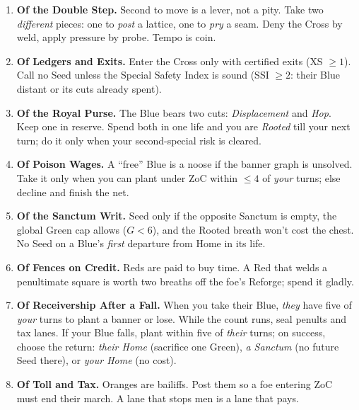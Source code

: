 \documentclass[11pt]{article}
\begin{document}
\begin{enumerate}[leftmargin=*,label=\Roman*.]

\item \textbf{Of the Double Step.} Second to move is a lever, not a pity. Take two \emph{different} pieces: one to \emph{post} a lattice, one to \emph{pry} a seam. Deny the Cross by weld, apply pressure by probe. Tempo is coin.

\item \textbf{Of Ledgers and Exits.} Enter the Cross only with certified exits (\textsc{XS} $\ge 1$). Call no Seed unless the Special Safety Index is sound (\textsc{SSI} $\ge 2$: their Blue distant or its cuts already spent).

\item \textbf{Of the Royal Purse.} The Blue bears two cuts: \emph{Displacement} and \emph{Hop}. Keep one in reserve. Spend both in one life and you are \emph{Rooted} till your next turn; do it only when your second-special risk is cleared.

\item \textbf{Of Poison Wages.} A “free” Blue is a noose if the banner graph is unsolved. Take it only when you can plant under ZoC within $\le 4$ of \emph{your} turns; else decline and finish the net.

\item \textbf{Of the Sanctum Writ.} Seed only if the opposite Sanctum is empty, the global Green cap allows ($G<6$), and the Rooted breath won’t cost the chest. No Seed on a Blue’s \emph{first} departure from Home in its life.

\item \textbf{Of Fences on Credit.} Reds are paid to buy time. A Red that welds a penultimate square is worth two breaths off the foe’s Reforge; spend it gladly.

\item \textbf{Of Receivership After a Fall.} When you take their Blue, \emph{they} have five of \emph{your} turns to plant a banner or lose. While the count runs, seal penults and tax lanes. If your Blue falls, plant within five of \emph{their} turns; on success, choose the return: \emph{their Home} (sacrifice one Green), \emph{a Sanctum} (no future Seed there), or \emph{your Home} (no cost).

\item \textbf{Of Toll and Tax.} Oranges are bailiffs. Post them so a foe entering ZoC must end their march. A lane that stops men is a lane that pays.


\end{enumerate}
\end{document}
